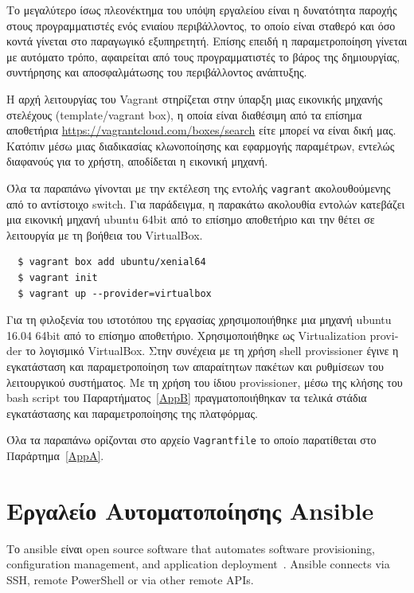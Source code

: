 \documentclass[12pt]{report}
\begin{document}
Το μεγαλύτερο ίσως πλεονέκτημα του υπόψη εργαλείου είναι η δυνατότητα παροχής στους προγραμματιστές ενός ενιαίου περιβάλλοντος, το οποίο είναι σταθερό και όσο κοντά γίνεται στο παραγωγικό εξυπηρετητή. Επίσης επειδή η παραμετροποίηση γίνεται με αυτόματο τρόπο, αφαιρείται από τους προγραμματιστές το βάρος της δημιουργίας, συντήρησης και αποσφαλμάτωσης του περιβάλλοντος ανάπτυξης.

Η αρχή λειτουργίας του \textlatin{Vagrant} στηρίζεται στην ύπαρξη μιας εικονικής μηχανής στελέχους (\textlatin{template/vagrant box}), η οποία είναι διαθέσιμη από τα επίσημα αποθετήρια \textlatin{\url{https://vagrantcloud.com/boxes/search}} είτε μπορεί να είναι δική μας. Κατόπιν μέσω μιας διαδικασίας κλωνοποίησης και εφαρμογής παραμέτρων, εντελώς διαφανούς για το χρήστη, αποδίδεται η εικονική μηχανή.

Όλα τα παραπάνω γίνονται με την εκτέλεση της εντολής \textlatin{\texttt{vagrant}} ακολουθούμενης από το αντίστοιχο \textlatin{switch}. Για παράδειγμα, η παρακάτω ακολουθία εντολών κατεβάζει μια εικονική μηχανή \textlatin{ubuntu 64bit} από το επίσημο αποθετήριο και την θέτει σε λειτουργία με τη βοήθεια του \textlatin{VirtualBox}.
\begin{Verbatim}
  $ vagrant box add ubuntu/xenial64
  $ vagrant init
  $ vagrant up --provider=virtualbox
\end{Verbatim}
Για τη φιλοξενία του ιστοτόπου της εργασίας χρησιμοποιήθηκε μια μηχανή \textlatin{ubuntu 16.04 64bit} από το επίσημο αποθετήριο. Xρησιμοποιήθηκε ως \textlatin{Virtualization provider} το λογισμικό \textlatin{VirtualBox}. Στην συνέχεια με τη χρήση \textlatin{shell provissioner} έγινε η εγκατάσταση και παραμετροποίηση των απαραίτητων πακέτων και ρυθμίσεων του λειτουργικού συστήματος. Με τη χρήση του ίδιου \textlatin{provissioner}, μέσω της κλήσης του \textlatin{bash script} του Παραρτήματος~\ref{AppB} πραγματοποιήθηκαν τα τελικά στάδια εγκατάστασης και παραμετροποίησης της πλατφόρμας.

Όλα τα παραπάνω ορίζονται στο αρχείο \textlatin{\texttt{Vagrantfile}} το οποίο παρατίθεται στο Παράρτημα~\ref{AppA}.

\section{Εργαλείο Αυτοματοποίησης \textlatin{Ansible}}\label{ansible}
Το \textlatin{ansible} είναι open source software that automates software provisioning, configuration management, and application deployment~\cite{wikipedia_2019}. Ansible connects via SSH, remote PowerShell or via other remote APIs.
\end{document}
